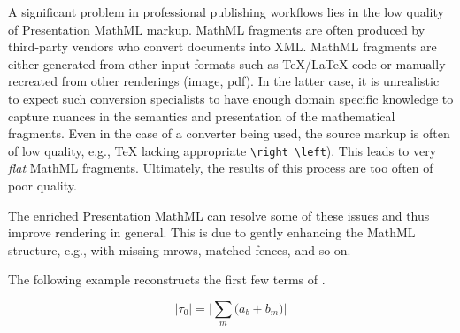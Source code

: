 \documentclass{llncs}
\begin{document}
A significant problem in professional publishing 
workflows lies in the low quality of Presentation MathML markup. MathML 
fragments are often produced by third-party vendors who convert documents 
into XML. MathML fragments are either generated from other input 
formats such as TeX/LaTeX code or manually recreated from other renderings
(image, pdf). 
In the latter case, it is unrealistic to expect such conversion 
specialists to have enough domain specific knowledge to capture 
nuances in the semantics and presentation of the mathematical fragments. Even 
in the case of a converter being used, the source markup is often of low 
quality, e.g., TeX lacking appropriate \texttt{\textbackslash right 
\textbackslash left}). This leads to very \emph{flat} MathML fragments. 
Ultimately, the results of this process are too often of poor quality.

The enriched Presentation MathML can resolve some of these issues and 
thus improve rendering in general. This is due to gently enhancing the MathML 
structure, e.g., with missing mrows, matched fences, and so on. 


The following example reconstructs the first few terms of \cite[Eq. 
17]{Chang-Hasnain:12}.

\[ 
\biggl\vert \tau_0 \biggr\vert = \biggl\vert  \sum_{m} \bigg(a_b + b_m\bigg) 
\bigg\vert 
\]
\end{document}
